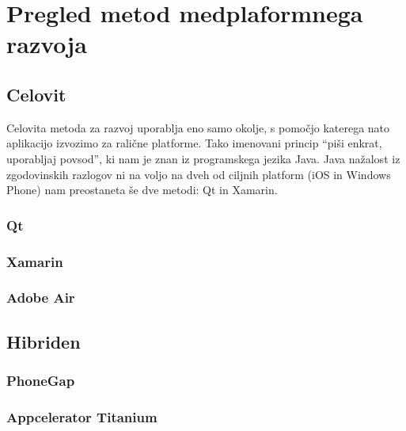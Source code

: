 \graphicspath{{img/}}









\chapter{Pregled metod medplaformnega razvoja}
\label{chap:overview}


\section{Celovit}

Celovita metoda za razvoj uporablja eno samo okolje, s pomočjo katerega nato aplikacijo izvozimo za ralične platforme. Tako imenovani princip ``piši enkrat, uporabljaj povsod'', ki nam je znan iz programskega jezika Java. Java nažalost iz zgodovinskih razlogov ni na voljo na dveh od ciljnih platform (iOS in Windows Phone) nam preostaneta še dve metodi: Qt in Xamarin.

\subsection{Qt}

\subsection{Xamarin}

\subsection{Adobe Air}

\section{Hibriden}

\subsection{PhoneGap}

\subsection{Appcelerator Titanium}

